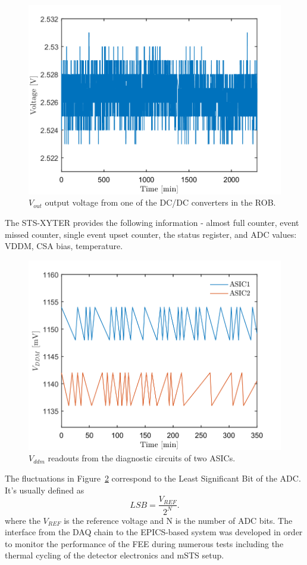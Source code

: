 \begin{figure}[!h]
    \centering
    \includegraphics[width=0.65\columnwidth]{Chapter4/images/ROB.png}
    \caption{$V_{out}$ output voltage from one of the DC/DC converters in the \gls{ROB}.}
    \label{fig:ROB}
\end{figure}
\newpage
The STS-XYTER provides the following information - almost full counter, event missed counter, single event upset counter, the status register, and \gls{ADC} values: VDDM, \gls{CSA} bias, temperature. 

\begin{figure}[!h]
    \centering
    \includegraphics[width=0.65\columnwidth]{Chapter4/images/FEB.png}
    \caption{$V_{ddm}$ readouts from the diagnostic circuits of two ASICs.}
    \label{fig:vddm_first}
\end{figure}
The fluctuations in Figure~\ref{fig:vddm_first} correspond  to the Least Significant Bit of the \gls{ADC}. It's usually defined as
\begin{equation}
    LSB = \frac{V_{REF}}{2^{N}}.
\end{equation}
where the $V_{REF}$ is the reference voltage and N is the number of ADC bits. 
The interface from the \gls{DAQ} chain to the \gls{EPICS}-based system was developed in order to monitor the performance of the \gls{FEE} during numerous tests including the thermal cycling of the detector electronics and \gls{mSTS} setup. 


